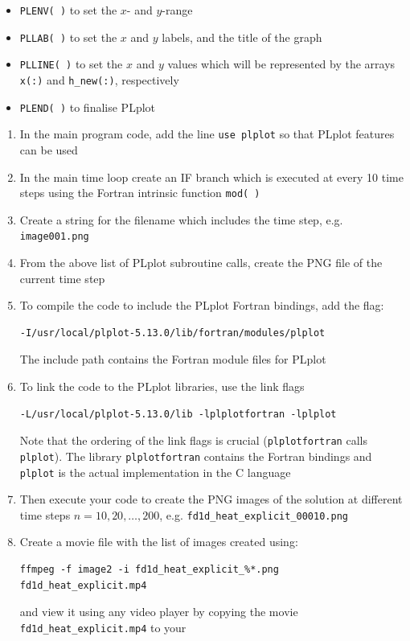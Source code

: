 \documentclass[12pt]{article}
\begin{document}
\begin{enumerate}
\begin{itemize}
\item\texttt{PLENV( )} to set the $x$- and $y$-range
\item\texttt{PLLAB( )} to set the $x$ and $y$ labels, and the title of the graph
\item\texttt{PLLINE( )} to set the $x$ and $y$ values which will be represented by the
  arrays \texttt{x(:)} and \texttt{h\_new(:)}, respectively
\item\texttt{PLEND( )} to finalise PLplot
\end{itemize}  
\begin{enumerate}
\item In the main program code, add the line \texttt{use plplot} so that PLplot features can be
used
\item In the main time loop create an IF branch which is executed at every 10 time steps
using the Fortran intrinsic function \texttt{mod( )}
\item Create a string for the filename which includes the time step, e.g. 
\texttt{image001.png}
\item From the above list of PLplot subroutine calls, create the PNG file of the
current time step
\item To compile the code to include the PLplot Fortran bindings, add the flag:
\begin{verbatim}
-I/usr/local/plplot-5.13.0/lib/fortran/modules/plplot
\end{verbatim}
The include path contains the Fortran module files for PLplot
\item To link the code to the PLplot libraries, use the link flags
\begin{verbatim}
-L/usr/local/plplot-5.13.0/lib -lplplotfortran -lplplot
\end{verbatim}
Note that the ordering of the link flags is crucial (\texttt{plplotfortran} calls \texttt{plplot}). The
library \texttt{plplotfortran} contains the Fortran bindings and \texttt{plplot} is the actual
implementation in the C language
\item Then execute your code to create the PNG images of the solution at
  different time steps $n = 10,20,\ldots, 200$, e.g.
  \texttt{fd1d\_heat\_explicit\_00010.png}
\item Create a movie file with the list of images created using:
\begin{verbatim}
ffmpeg -f image2 -i fd1d_heat_explicit_%*.png fd1d_heat_explicit.mp4
\end{verbatim}
and view it using any video player by copying the movie \texttt{fd1d\_heat\_explicit.mp4} to your

\end{enumerate}
\end{enumerate}
\end{document}
